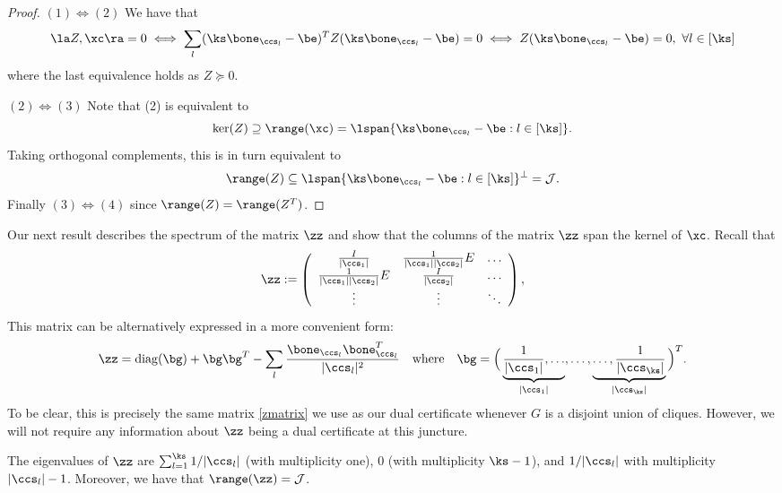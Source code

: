 \begin{proof}$(1)\Longleftrightarrow (2)$ We have that 
$$\la Z, \xc\ra=0 \iff \sum_l(\ks\bone_{\ccs_l}-\be)^T Z (\ks\bone_{\ccs_l}-\be)=0\iff Z(\ks\bone_{\ccs_l} -\be)=0, \  \forall l \in [\ks]$$ 
 where the last equivalence holds as  $Z\succeq 0$. 

$(2)\Longleftrightarrow (3)$ Note that (2) is equivalent to  
$$\ker(Z)\supseteq  \range(\xc)=\lspan\{ \ks \bone_{\ccs_l} -\be: l\in [\ks]\}.$$ 
Taking orthogonal complements, this is in turn equivalent to 
$$\range(Z)\subseteq \lspan\{ \ks\bone_{\ccs_l} -\be: l\in [\ks]\}^\perp=\mathcal{J}.$$
Finally $(3) \iff (4)$ since $\range(Z)=\range(Z^T)$. 
\end{proof}


Our next result describes the spectrum of the matrix $\zz$ 
and  show that the columns of the matrix $\zz$ span the kernel of $\xc$. Recall that
\begin{equation}\label{zfullmatrix}
\zz := \left(\begin{array}{ccc}
\frac{I}{|\ccs_1|} & \frac{1}{|\ccs_1||\ccs_2|} E & \ldots \\
\frac{1}{|\ccs_1||\ccs_2|} E & \frac{I}{|\ccs_2|} & \ldots \\
\vdots & \vdots & \ddots
 \end{array}\right),
\end{equation}
This matrix can be alternatively expressed in a more convenient form:
$$
\zz = \mathrm{diag}(\bg) + \bg\bg^T - \sum_{l} \frac{\bone_{\ccs_l}\bone_{\ccs_l}^T}{|\ccs_l|^2} \quad \text{where} \quad \bg = \Big(\underbrace{\frac{1}{|\ccs_1|}, \ldots }_{|\ccs_1|} , \ldots,  \underbrace{\ldots, \frac{1}{|\ccs_{\ks}|} }_{|\ccs_{\ks}|} \Big)^T.
$$
To be clear, this is precisely the same matrix \eqref{zmatrix} we use as our dual certificate whenever $G$ is a disjoint union of cliques.  However, we will not require any information about $\zz$ being a dual certificate at this juncture.  
\begin{proposition} \label{thm:Unequalsizecanonicalmatrix_spectrum}
The eigenvalues of $\zz$ are $\sum_{l=1}^{\ks} 1/|\ccs_l|$ (with multiplicity one), $0$ (with multiplicity $\ks-1$), and $1/|\ccs_l|$ with multiplicity $|\ccs_l|-1$. Moreover, we have that 
$\range(\zz)=\mathcal{J}$.
\end{proposition}

